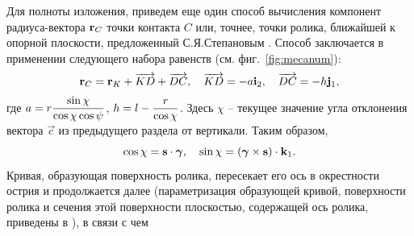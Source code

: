 Для полноты изложения, приведем еще один способ вычисления компонент радиуса-вектора ${\bf r}_{C}$ точки контакта $C$ или, точнее, точки ролика, ближайшей к опорной плоскости, предложенный С.Я.Степановым \cite{KosenkoGerasimov2015}. Способ заключается в применении следующего набора равенств (см. фиг.~\ref{fig:mecanum}):
$$
{\bf r}_{C}={\bf r}_{K}+\overrightarrow{KD}+\overrightarrow{DC},\quad
\overrightarrow{KD}=-a{\bf i}_2,\quad\overrightarrow{DC}=-h{\bf j}_1,
$$
где $a = r\displaystyle\frac{\displaystyle \sin\chi}{\displaystyle \cos\chi\cos\psi}$, $h = l - \displaystyle\frac{\displaystyle r}{\displaystyle \cos\chi}$. Здесь $\chi$ -- текущее значение угла отклонения вектора $\vec{c}$ из предыдущего раздела от 
вертикали. Таким образом,
$$
    \cos\chi = \boldsymbol{\mathbf{s}} \cdot \boldsymbol{\mathbf{\gamma}}, \quad \sin\chi = 
    \left( \boldsymbol{\mathbf{\gamma}} \times \boldsymbol{\mathbf{s}} \right) \cdot {\bf k}_1.
$$
Кривая, образующая поверхность ролика, пересекает его ось в окрестности острия и продолжается далее (параметризация образующей кривой, поверхности ролика и сечения этой поверхности плоскостью, содержащей ось ролика, приведены в \cite{Gfrerrer2008}), в связи с чем
